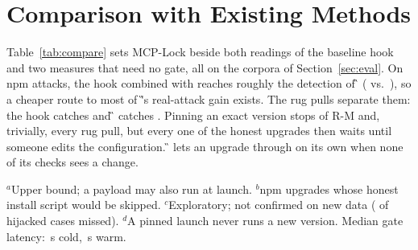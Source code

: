 \section{Comparison with Existing Methods}
\label{sec:compare}
Table~\ref{tab:compare} sets MCP-Lock beside both readings of the baseline hook and two measures that need no gate,
all on the corpora of Section~\ref{sec:eval}. On npm attacks, the hook combined with  reaches
roughly the detection of \G{} (\SCIgnP{} vs.\ \GNpmP), so a cheaper route to most of \G's real-attack gain exists. The
rug pulls separate them: the hook catches \RSSC{} and \G{} catches \RSG. Pinning an exact version stops \PinRMP{} of
R-M and, trivially, every rug pull, but every one of the \NB{} honest upgrades then waits until someone edits the
configuration. \G{} lets an upgrade through on its own when none of its checks sees a change.

\begin{table}[t]
\caption{Comparison with existing methods.\\
\textmd{R: real attacks ($n=\NR$); R-S: synthetic rug pulls; B: benign upgrades ($n=\NB$). The npm column uses the
npm cases of R-M. -- not applicable.}}
\label{tab:compare}
\centering
\footnotesize
\setlength{\tabcolsep}{2.5pt}

\vspace{2pt}
\begin{minipage}{\columnwidth}\scriptsize
$^{a}$Upper bound; a payload may also run at launch. $^{b}$npm upgrades whose honest install script would be skipped.
$^{c}$Exploratory; not confirmed on new data (\AoneLost{} of \AoneRC{} hijacked cases missed). $^{d}$A pinned launch
never runs a new version. Median gate latency: \LatColdMed{}\,s cold, \LatWarmMed{}\,s warm.
\end{minipage}
\end{table}
